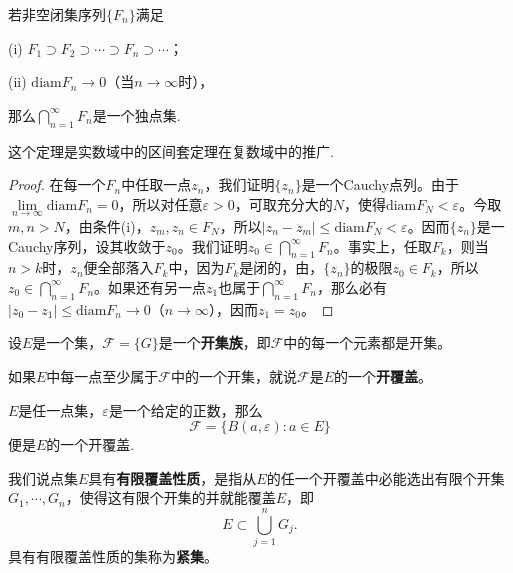 \documentclass[../../main.tex]{subfiles}
\begin{document}
\begin{theorem}[Cantor闭集套定理]\label{theorem:Cantor闭集套定理}
若非空闭集序列\(\{ F_n \}\)满足

(i) \(F_1 \supset F_2 \supset \cdots \supset F_n \supset \cdots\)；

(ii) \(\mathrm{diam}F_n \to 0\)（当\(n \to \infty\)时），

那么\(\bigcap_{n = 1}^\infty F_n\)是一个独点集.
\end{theorem}
\begin{note}
这个定理是实数域中的区间套定理在复数域中的推广.
\end{note}
\begin{proof}
在每一个\(F_n\)中任取一点\(z_n\)，我们证明\(\{ z_n \}\)是一个Cauchy点列。由于\(\lim\limits_{n \to \infty}\mathrm{diam}F_n = 0\)，所以对任意\(\varepsilon > 0\)，可取充分大的\(N\)，使得\(\mathrm{diam}F_N < \varepsilon\)。今取\(m, n > N\)，由条件(i)，\(z_m, z_n \in F_N\)，所以\(| z_n - z_m | \leqslant \mathrm{diam}F_N < \varepsilon\)。因而\(\{ z_n \}\)是一Cauchy序列，设其收敛于\(z_0\)。我们证明\(z_0 \in \bigcap_{n = 1}^\infty F_n\)。事实上，任取\(F_k\)，则当\(n > k\)时，\(z_n\)便全部落入\(F_k\)中，因为\(F_k\)是闭的，由，\(\{ z_n \}\)的极限\(z_0 \in F_k\)，所以\(z_0 \in \bigcap_{n = 1}^\infty F_n\)。如果还有另一点\(z_1\)也属于\(\bigcap_{n = 1}^\infty F_n\)，那么必有\(| z_0 - z_1 | \leqslant \mathrm{diam}F_n \to 0\)（\(n \to \infty\)），因而\(z_1 = z_0\)。 

\end{proof}

\begin{definition}
设\(E\)是一个集，\(\mathscr{F} = \{ G \}\)是一个\textbf{开集族}，即\(\mathscr{F}\)中的每一个元素都是开集。

如果\(E\)中每一点至少属于\(\mathscr{F}\)中的一个开集，就说\(\mathscr{F}\)是\(E\)的一个\textbf{开覆盖}。
\end{definition}

\begin{example}
\(E\)是任一点集，\(\varepsilon\)是一个给定的正数，那么
\[
\mathscr{F} = \{ B(a, \varepsilon) : a \in E \}
\]
便是\(E\)的一个开覆盖.
\end{example}

\begin{definition}
我们说点集\(E\)具有\textbf{有限覆盖性质}，是指从\(E\)的任一个开覆盖中必能选出有限个开集\(G_1, \cdots, G_n\)，使得这有限个开集的并就能覆盖\(E\)，即
\[
E \subset \bigcup_{j = 1}^n G_j.
\]
具有有限覆盖性质的集称为\textbf{紧集}。
\end{definition}
\end{document}
